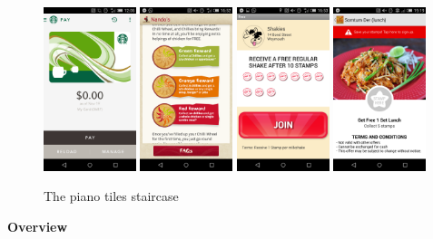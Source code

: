 \begin{figure}[H]
  \centering
    \includegraphics[width=0.24\textwidth]{img/starbucks.png}
    \includegraphics[width=0.24\textwidth]{img/nandos.png}
    \includegraphics[width=0.24\textwidth]{img/tagmate.png}
    \includegraphics[width=0.24\textwidth]{img/stamp.png}
      \caption{The piano tiles staircase}
\end{figure}
\textbf{Overview}

